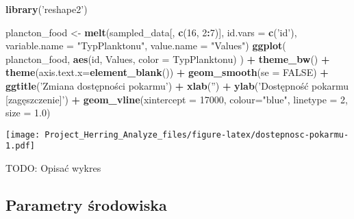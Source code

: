 \documentclass[]{article}
\newenvironment{Shaded}{\begin{snugshade}}{\end{snugshade}}
\newcommand{\DataTypeTok}[1]{\textcolor[rgb]{0.13,0.29,0.53}{#1}}
\newcommand{\DecValTok}[1]{\textcolor[rgb]{0.00,0.00,0.81}{#1}}
\newcommand{\FloatTok}[1]{\textcolor[rgb]{0.00,0.00,0.81}{#1}}
\newcommand{\KeywordTok}[1]{\textcolor[rgb]{0.13,0.29,0.53}{\textbf{#1}}}
\newcommand{\NormalTok}[1]{#1}
\newcommand{\OperatorTok}[1]{\textcolor[rgb]{0.81,0.36,0.00}{\textbf{#1}}}
\newcommand{\OtherTok}[1]{\textcolor[rgb]{0.56,0.35,0.01}{#1}}
\newcommand{\StringTok}[1]{\textcolor[rgb]{0.31,0.60,0.02}{#1}}
\begin{document}
\begin{Shaded}
\begin{Highlighting}[]
\KeywordTok{library}\NormalTok{(}\StringTok{'reshape2'}\NormalTok{)}

\NormalTok{plancton_food <-}\StringTok{ }\KeywordTok{melt}\NormalTok{(sampled_data[, }\KeywordTok{c}\NormalTok{(}\DecValTok{16}\NormalTok{, }\DecValTok{2}\OperatorTok{:}\DecValTok{7}\NormalTok{)], }\DataTypeTok{id.vars =} \KeywordTok{c}\NormalTok{(}\StringTok{'id'}\NormalTok{), }\DataTypeTok{variable.name =} \StringTok{"TypPlanktonu"}\NormalTok{, }\DataTypeTok{value.name =} \StringTok{"Values"}\NormalTok{)}
\KeywordTok{ggplot}\NormalTok{(}
\NormalTok{  plancton_food,}
  \KeywordTok{aes}\NormalTok{(id, Values, }\DataTypeTok{color =}\NormalTok{ TypPlanktonu)}
\NormalTok{) }\OperatorTok{+}\StringTok{ }\KeywordTok{theme_bw}\NormalTok{() }\OperatorTok{+}\StringTok{ }
\StringTok{  }\KeywordTok{theme}\NormalTok{(}\DataTypeTok{axis.text.x=}\KeywordTok{element_blank}\NormalTok{()) }\OperatorTok{+}\StringTok{ }\KeywordTok{geom_smooth}\NormalTok{(}\DataTypeTok{se =} \OtherTok{FALSE}\NormalTok{) }\OperatorTok{+}\StringTok{ }\KeywordTok{ggtitle}\NormalTok{(}\StringTok{'Zmiana dostępności pokarmu'}\NormalTok{) }\OperatorTok{+}\StringTok{  }\KeywordTok{xlab}\NormalTok{(}\StringTok{''}\NormalTok{) }\OperatorTok{+}\StringTok{ }\KeywordTok{ylab}\NormalTok{(}\StringTok{'Dostępność pokarmu [zagęszczenie]'}\NormalTok{) }\OperatorTok{+}\StringTok{ }\KeywordTok{geom_vline}\NormalTok{(}\DataTypeTok{xintercept =} \DecValTok{17000}\NormalTok{, }\DataTypeTok{colour=}\StringTok{"blue"}\NormalTok{, }\DataTypeTok{linetype =} \DecValTok{2}\NormalTok{, }\DataTypeTok{size =} \FloatTok{1.0}\NormalTok{)}
\end{Highlighting}
\end{Shaded}

\texttt{[image: Project\_Herring\_Analyze\_files/figure-latex/dostepnosc-pokarmu-1.pdf]}

TODO: Opisać wykres

\hypertarget{parametry-ux15brodowiska}{%
\subsection{Parametry środowiska}\label{parametry-ux15brodowiska}}
\end{document}

